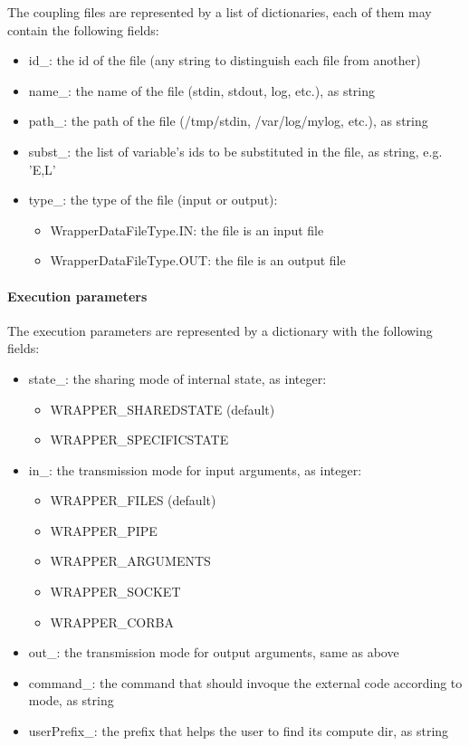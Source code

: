 The coupling files are represented by a list of dictionaries, each of them may contain the following fields:
\begin{itemize}
\item id\_: the id of the file (any string to distinguish each file from another)
\item name\_: the name of the file (stdin, stdout, log, etc.), as string
\item path\_: the path of the file (/tmp/stdin, /var/log/mylog, etc.), as string
\item subst\_: the list of variable's ids to be substituted in the file, as string, e.g. 'E,L'
\item type\_: the type of the file (input or output):
  \begin{itemize}
  \item WrapperDataFileType.IN: the file is an input file
  \item WrapperDataFileType.OUT: the file is an output file
  \end{itemize}
\end{itemize}

\paragraph{Execution parameters}

The execution parameters are represented by a dictionary with the following fields:
\begin{itemize}
\item state\_: the sharing mode of internal state, as integer:
  \begin{itemize}
  \item WRAPPER\_SHAREDSTATE (default)
  \item WRAPPER\_SPECIFICSTATE
  \end{itemize}
\item in\_: the transmission mode for input arguments, as integer:
  \begin{itemize}
  \item WRAPPER\_FILES (default)
  \item WRAPPER\_PIPE
  \item WRAPPER\_ARGUMENTS
  \item WRAPPER\_SOCKET
  \item WRAPPER\_CORBA
  \end{itemize}
\item out\_: the transmission mode for output arguments, same as above
\item command\_: the command that should invoque the external code according to mode, as string
\item userPrefix\_: the prefix that helps the user to find its compute dir, as string
\end{itemize}

